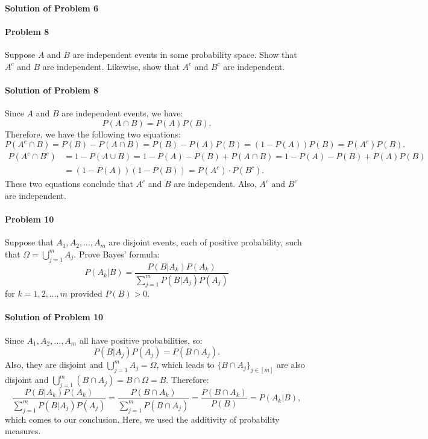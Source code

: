 \documentclass{article}
\begin{document}
\paragraph{Solution of Problem 6} 





\paragraph{Problem 8} Suppose $A$ and $B$ are independent events in some probability space. Show that $A^c$ and $B$ are independent. Likewise, show that $A^c$ and $B^c$ are independent. 

\paragraph{Solution of Problem 8} Since $A$ and $B$ are independent events, we have:
\[P(A\cap B)=P(A)P(B).\]
Therefore, we have the following two equations:
\[P(A^c\cap B)=P(B)-P(A\cap B)=P(B)-P(A)P(B)=(1-P(A))P(B)=P(A^c)P(B).\]
\begin{equation*}
\begin{aligned}
P(A^c\cap B^c) &= 1-P(A\cup B)=1-P(A)-P(B)+P(A\cap B)=1-P(A)-P(B)+P(A)P(B)\\
&=(1-P(A))(1-P(B))=P(A^c)\cdot P(B^c).
\end{aligned}    
\end{equation*}
These two equations conclude that $A^c$ and $B$ are independent. Also, $A^c$ and $B^c$ are independent. 



\paragraph{Problem 10} Suppose that $A_1, A_2,\ldots, A_m$ are disjoint events, each of positive probability, such that $\Omega=\bigcup_{j=1}^{m} A_j$. Prove Bayes' formula:
\[P(A_k|B)=\frac{P(B|A_k)P(A_k)}{\sum_{j=1}^{m}P(B|A_j)P(A_j)}\]
for $k=1,2,\ldots, m$ provided $P(B)>0$.

\paragraph{Solution of Problem 10} Since $A_1, A_2, \ldots, A_m$ all have positive probabilities, so:
\[P(B|A_j)P(A_j)=P(B\cap A_j).\]
Also, they are disjoint and $\bigcup_{j=1}^{m}A_j=\Omega$, which leads to $\{B\cap A_j\}_{j\in[m]}$ are also disjoint and $\bigcup_{j=1}^{m}(B\cap A_j)=B\cap \Omega=B$. Therefore:
\[\frac{P(B|A_k)P(A_k)}{\sum_{j=1}^{m}P(B|A_j)P(A_j)}=\frac{P(B\cap A_k)}{\sum_{j=1}^{m}P(B\cap A_j)}=\frac{P(B\cap A_k)}{P(B)}=P(A_k|B),\]
which comes to our conclusion. Here, we used the additivity of probability measures.
\end{document}
